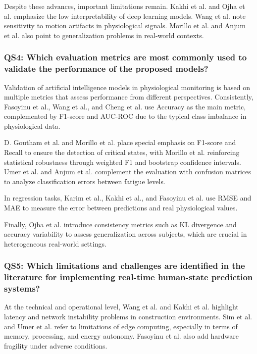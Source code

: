 \documentclass[runningheads]{llncs}
\begin{document}
Despite these advances, important limitations remain. Kakhi et al. and Ojha et al.\cite{kakhi2025,ojha2024} emphasize the low interpretability of deep learning models. Wang et al.\cite{wang2024} note sensitivity to motion artifacts in physiological signals. Morillo et al. and Anjum et al.\cite{albarran2025,anjum2025} also point to generalization problems in real-world contexts.

\subsubsection*{QS4: Which evaluation metrics are most commonly used to validate the performance of the proposed models?}
\label{subsec:qs4}

Validation of artificial intelligence models in physiological monitoring is based on multiple metrics that assess performance from different perspectives. Consistently, Fasoyinu et al., Wang et al., and Cheng et al.\cite{fasoyinu2025,wang2024,cheng2025} use Accuracy as the main metric, complemented by F1-score and AUC-ROC due to the typical class imbalance in physiological data.

D. Goutham et al. and Morillo et al.\cite{goutham2025,albarran2025} place special emphasis on F1-score and Recall to ensure the detection of critical states, with Morillo et al. reinforcing statistical robustness through weighted F1 and bootstrap confidence intervals. Umer et al. and Anjum et al.\cite{umer2025,anjum2025} complement the evaluation with confusion matrices to analyze classification errors between fatigue levels.

In regression tasks, Karim et al., Kakhi et al., and Fasoyinu et al.\cite{karim2025,kakhi2025,fasoyinu2025} use RMSE and MAE to measure the error between predictions and real physiological values.

Finally, Ojha et al.\cite{ojha2024} introduce consistency metrics such as KL divergence and accuracy variability to assess generalization across subjects, which are crucial in heterogeneous real-world settings.

\subsubsection*{QS5: Which limitations and challenges are identified in the literature for implementing real-time human-state prediction systems?}
\label{subsec:qs5}
At the technical and operational level, Wang et al. and Kakhi et al.\cite{wang2024,kakhi2025} highlight latency and network instability problems in construction environments. Sim et al. and Umer et al.\cite{sim2023,umer2025} refer to limitations of edge computing, especially in terms of memory, processing, and energy autonomy. Fasoyinu et al.\cite{fasoyinu2025} also add hardware fragility under adverse conditions.
\end{document}
